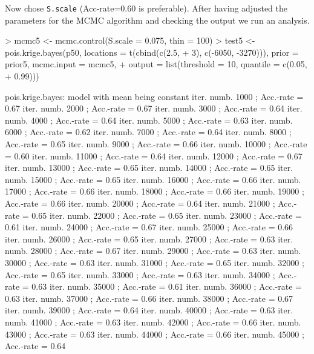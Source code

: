 \documentclass[12pt,a4paper]{article}
\newcommand{\code}[1]{\texttt{\small #1}}
\begin{document}
Now chose \code{S.scale} (Acc-rate=0.60 is preferable).  
After having adjusted the parameters for the MCMC algorithm and checking the output we run an analysis.
\begin{Schunk}
\begin{Sinput}
> mcmc5 <- mcmc.control(S.scale = 0.075, thin = 100)
> test5 <- pois.krige.bayes(p50, locations = t(cbind(c(2.5, 
+     3), c(-6050, -3270))), prior = prior5, mcmc.input = mcmc5, 
+     output = list(threshold = 10, quantile = c(0.05, 
+         0.99)))
\end{Sinput}
\end{Schunk}
\begin{Schunk}
\begin{Soutput}
pois.krige.bayes: model with mean being constant
iter. numb. 1000 ; Acc.-rate = 0.67 
iter. numb. 2000 ; Acc.-rate = 0.67 
iter. numb. 3000 ; Acc.-rate = 0.64 
iter. numb. 4000 ; Acc.-rate = 0.64 
iter. numb. 5000 ; Acc.-rate = 0.63 
iter. numb. 6000 ; Acc.-rate = 0.62 
iter. numb. 7000 ; Acc.-rate = 0.64 
iter. numb. 8000 ; Acc.-rate = 0.65 
iter. numb. 9000 ; Acc.-rate = 0.66 
iter. numb. 10000 ; Acc.-rate = 0.60 
iter. numb. 11000 ; Acc.-rate = 0.64 
iter. numb. 12000 ; Acc.-rate = 0.67 
iter. numb. 13000 ; Acc.-rate = 0.65 
iter. numb. 14000 ; Acc.-rate = 0.65 
iter. numb. 15000 ; Acc.-rate = 0.65 
iter. numb. 16000 ; Acc.-rate = 0.66 
iter. numb. 17000 ; Acc.-rate = 0.66 
iter. numb. 18000 ; Acc.-rate = 0.66 
iter. numb. 19000 ; Acc.-rate = 0.66 
iter. numb. 20000 ; Acc.-rate = 0.64 
iter. numb. 21000 ; Acc.-rate = 0.65 
iter. numb. 22000 ; Acc.-rate = 0.65 
iter. numb. 23000 ; Acc.-rate = 0.61 
iter. numb. 24000 ; Acc.-rate = 0.67 
iter. numb. 25000 ; Acc.-rate = 0.66 
iter. numb. 26000 ; Acc.-rate = 0.65 
iter. numb. 27000 ; Acc.-rate = 0.63 
iter. numb. 28000 ; Acc.-rate = 0.67 
iter. numb. 29000 ; Acc.-rate = 0.63 
iter. numb. 30000 ; Acc.-rate = 0.63 
iter. numb. 31000 ; Acc.-rate = 0.65 
iter. numb. 32000 ; Acc.-rate = 0.65 
iter. numb. 33000 ; Acc.-rate = 0.63 
iter. numb. 34000 ; Acc.-rate = 0.63 
iter. numb. 35000 ; Acc.-rate = 0.61 
iter. numb. 36000 ; Acc.-rate = 0.63 
iter. numb. 37000 ; Acc.-rate = 0.66 
iter. numb. 38000 ; Acc.-rate = 0.67 
iter. numb. 39000 ; Acc.-rate = 0.64 
iter. numb. 40000 ; Acc.-rate = 0.63 
iter. numb. 41000 ; Acc.-rate = 0.63 
iter. numb. 42000 ; Acc.-rate = 0.66 
iter. numb. 43000 ; Acc.-rate = 0.63 
iter. numb. 44000 ; Acc.-rate = 0.66 
iter. numb. 45000 ; Acc.-rate = 0.64 

\end{Soutput}
\end{Schunk}
\end{document}
